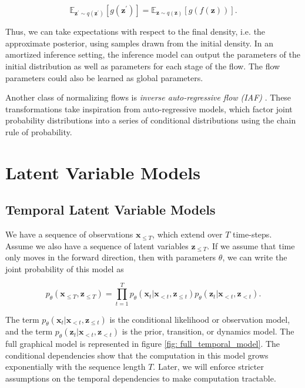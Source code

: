 \begin{equation}
	\mathbb{E}_{\mathbf{z}^\prime \sim q (\mathbf{z}^\prime)} \left[ g(\mathbf{z}^\prime) \right] = \mathbb{E}_{\mathbf{z} \sim q (\mathbf{z})} \left[ g( f (\mathbf{z})) \right].
\end{equation}

\noindent Thus, we can take expectations with respect to the final density, i.e. the approximate posterior, using samples drawn from the initial density. In an amortized inference setting, the inference model can output the parameters of the initial distribution as well as parameters for each stage of the flow. The flow parameters could also be learned as global parameters.


Another class of normalizing flows is \textit{inverse auto-regressive flow (IAF)} \cite{kingma2016improved}. These transformations take inspiration from auto-regressive models, which factor joint probability distributions into a series of conditional distributions using the chain rule of probability.



\section{Latent Variable Models}

\subsection{Temporal Latent Variable Models}

We have a sequence of observations $\mathbf{x}_{\leq T}$, which extend over $T$ time-steps. Assume we also have a sequence of latent variables $\mathbf{z}_{\leq T}$. If we assume that time only moves in the forward direction, then with parameters $\theta$, we can write the joint probability of this model as

\begin{equation}
	p_\theta (\mathbf{x}_{\leq T}, \mathbf{z}_{\leq T}) = \prod_{t=1}^T p_\theta (\mathbf{x}_{t} | \mathbf{x}_{< t}, \mathbf{z}_{\leq t}) p_\theta (\mathbf{z}_{t} | \mathbf{x}_{< t}, \mathbf{z}_{< t}).
\end{equation}

\noindent The term $p_\theta (\mathbf{x}_{t} | \mathbf{x}_{< t}, \mathbf{z}_{\leq t})$ is the conditional likelihood or observation model, and the term $p_\theta (\mathbf{z}_{t} | \mathbf{x}_{< t}, \mathbf{z}_{< t})$ is the prior, transition, or dynamics model. The full graphical model is represented in figure \ref{fig: full_temporal_model}. The conditional dependencies show that the computation in this model grows exponentially with the sequence length $T$. Later, we will enforce stricter assumptions on the temporal dependencies to make computation tractable.


